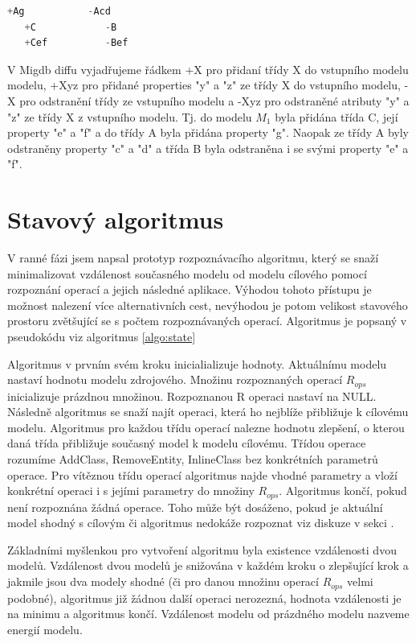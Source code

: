 \documentclass[11pt,twoside,a4paper]{book}
\begin{document}
 \begin{lstlisting}[language=JAVA,frame=single,caption=Textový diff
modelů $M_1$ a $M_2$,label=migdb_diff:delta]
   +Ag           -Acd
   +C            -B
   +Cef          -Bef
\end{lstlisting}

\FloatBarrier

V Migdb diffu vyjadřujeme řádkem +X pro přidaní třídy X do vstupního
modelu modelu, +Xyz pro přidané properties "y" a "z" ze třídy X do vstupního
modelu, -X pro odstranění třídy ze vstupního modelu a -Xyz pro odstraněné
atributy "y" a "z" ze třídy X z vstupního modelu. Tj. do modelu $M_1$ byla
přidána třída C, její property "e" a "f" a do třídy A byla přidána property
"g". Naopak ze třídy A byly odstraněny property "c" a "d" a třída B byla
odstraněna i se svými property "e" a "f".


\section{Stavový algoritmus}\label{sec:algo_state}

V ranné fázi jsem napsal prototyp rozpoznávacího algoritmu, který se snaží 
minimalizovat vzdálenost současného modelu od modelu cílového pomocí rozpoznání
operací a jejich následné aplikace. Výhodou tohoto přístupu je možnost nalezení
více alternativních cest, nevýhodou je potom velikost stavového prostoru
zvětšující se s počtem rozpoznávaných operací. Algoritmus je popsaný v
pseudokódu viz algoritmus \ref{algo:state}

Algoritmus v prvním svém kroku inicialializuje hodnoty.
Aktuálnímu modelu nastaví hodnotu modelu zdrojového. Množinu rozpoznaných
operací $R_{ops}$ inicializuje prázdnou množinou. Rozpoznanou R operaci nastaví
na NULL. Následně algoritmus se snaží najít operaci, která ho nejblíže
přibližuje k cílovému modelu. Algoritmus pro každou třídu operací nalezne
hodnotu zlepšení, o kterou daná třída přibližuje současný model k modelu
cílovému. Třídou operace rozumíme AddClass, RemoveEntity, InlineClass bez
konkrétních parametrů operace. Pro vítěznou třídu operací algoritmus najde
vhodné parametry a vloží konkrétní operaci i s jejími parametry do množiny
$R_{ops}$. Algoritmus končí, pokud není rozpoznána žádná operace. Toho může být
dosáženo, pokud je aktuální model shodný s cílovým či algoritmus nedokáže
rozpoznat viz diskuze v sekci .

Základními myšlenkou pro vytvoření algoritmu byla existence
vzdálenosti dvou modelů. Vzdálenost dvou modelů je snižována v každém
kroku o zlepšující krok a jakmile jsou dva modely shodné (či pro danou množinu
operací $R_{ops}$ velmi podobné), algoritmus již žádnou další operaci
nerozezná, hodnota vzdálenosti je na minimu a algoritmus končí.
Vzdálenost modelu od prázdného modelu nazveme energií modelu.
\end{document}
